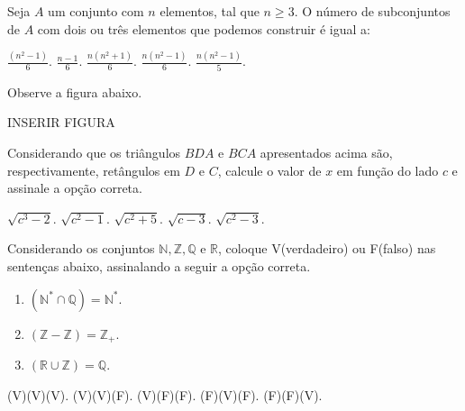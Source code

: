\begin{question}%
Seja \(A\) um conjunto com \(n\) elementos, tal que \(n \geq 3\). O número de subconjuntos de \(A\) com dois ou três elementos que podemos construir é igual a:
    \begin{tasks}
        \task \(\frac{(n^2-1)}{6}\).
        \task \(\frac{n-1}{6}\).
        \task \(\frac{n(n^2+1)}{6}\).
        \task \(\frac{n(n^2-1)}{6}\).
        \task \(\frac{n(n^2-1)}{5}\).
    \end{tasks}
\end{question}

\begin{question}%
Observe a figura abaixo.

INSERIR FIGURA

Considerando que os triângulos \(BDA\) e \(BCA\) apresentados acima são, respectivamente, retângulos em \(D\) e \(C\), calcule o valor de \(x\) em função do lado \(c\) e assinale a opção correta.
    \begin{tasks}
        \task \(\sqrt{c^3 - 2}\).
        \task \(\sqrt{c^2 - 1}\). 
        \task \(\sqrt{c^2 + 5}\).
        \task \(\sqrt{c - 3}\).
        \task \(\sqrt{c^2 -3}\).
    \end{tasks}
\end{question}

\begin{question}%
Considerando os conjuntos \(\mathbb{N},\mathbb{Z},\mathbb{Q}\) e \(\mathbb{R}\), coloque V(verdadeiro) ou F(falso) nas sentenças abaixo, assinalando a seguir a opção correta.

\begin{enumerate}[label=(~~)]
    \item \( (\mathbb{N}^{*} \cap \mathbb{Q}) = \mathbb{N}^{*}\).
    \item \( (\mathbb{Z} - \mathbb{Z}) = \mathbb{Z_{+}}\).
    \item \( ( \mathbb{R} \cup \mathbb{Z}) = \mathbb{Q}\).
\end{enumerate}
    \begin{tasks}
        \task (V)(V)(V).
        \task (V)(V)(F).
        \task (V)(F)(F).
        \task (F)(V)(F).
        \task (F)(F)(V).
    \end{tasks}
\end{question}
